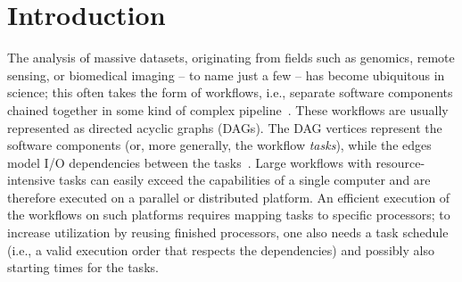 \documentclass[conference]{IEEEtran}
\newcommand{\skug}[1]{{\color{blue}[SK: #1]}}
\renewcommand{\iec}{i.e., }
\begin{document}
\begin{abstract}



    \end{abstract}


    \section{Introduction} %

%

    The analysis of massive datasets, originating from fields such as genomics, 
    remote sensing, or biomedical imaging -- to name just a few -- has become ubiquitous in science;
    this often takes the form of workflows, \iec separate software components chained together
    in some kind of complex pipeline~\cite{DBLP:journals/dbsk/LeserHDEGHKKKKK21}.
    These workflows are usually represented as directed acyclic graphs (DAGs).
    The DAG vertices represent the software components (or, more generally, the workflow \emph{tasks}),
    while the edges model I/O dependencies between the tasks~\cite{adhikari2019survey,liuPacitti}.
    Large workflows with resource-intensive tasks can easily exceed the capabilities of a 
    single computer and are therefore executed on a parallel or distributed platform.
    An efficient execution of the workflows on such platforms requires mapping tasks
    to specific processors; to increase utilization by reusing finished processors,
    one also needs a task schedule (\iec a valid execution order that respects the dependencies)
    and possibly also starting times for the tasks.
    
\end{document}
